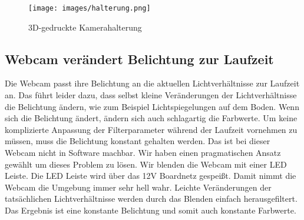\begin{figure}[ht]
	\centering
	\texttt{[image: images/halterung.png]}
	\caption{3D-gedruckte Kamerahalterung}
	\label{fig:halterung}
\end{figure}


\subsection{Webcam verändert Belichtung zur Laufzeit}
\label{sec:belichtung}
Die Webcam passt ihre Belichtung an die aktuellen Lichtverhältnisse zur Laufzeit an.
Das führt leider dazu, dass selbst kleine Veränderungen der Lichtverhältnisse die Belichtung ändern, wie zum Beispiel Lichtspiegelungen auf dem Boden.
Wenn sich die Belichtung ändert, ändern sich auch schlagartig die Farbwerte.
Um keine komplizierte Anpassung der Filterparameter während der Laufzeit vornehmen zu müssen, muss die Belichtung konstant gehalten werden.
Das ist bei dieser Webcam nicht in Software machbar.
Wir haben einen pragmatischen Ansatz gewählt um dieses Problem zu lösen.
Wir blenden die Webcam mit einer LED Leiste.
Die LED Leiste wird über das 12V Boardnetz gespeißt.
Damit nimmt die Webcam die Umgebung immer sehr hell wahr.
Leichte Veränderungen der tatsächlichen Lichtverhältnisse werden durch das Blenden einfach herausgefiltert. 
Das Ergebnis ist eine konstante Belichtung und somit auch konstante Farbwerte.

